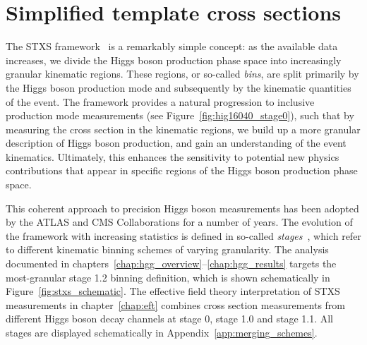 \section{Simplified template cross sections}\label{sec:theory_stxs}
The STXS framework~\cite{deFlorian:2016spz} is a remarkably simple concept: as the available data increases, we divide the Higgs boson production phase space into increasingly granular kinematic regions. These regions, or so-called \textit{bins}, are split primarily by the Higgs boson production mode and subsequently by the kinematic quantities of the event. The framework provides a natural progression to inclusive production mode measurements (see Figure~\ref{fig:hig16040_stage0}), such that by measuring the cross section in the kinematic regions, we build up a more granular description of Higgs boson production, and gain an understanding of the event kinematics. Ultimately, this enhances the sensitivity to potential new physics contributions that appear in specific regions of the Higgs boson production phase space.

This coherent approach to precision Higgs boson measurements has been adopted by the ATLAS and CMS Collaborations for a number of years. The evolution of the framework with increasing statistics is defined in so-called \textit{stages}~\cite{deFlorian:2016spz,Berger:2019wnu}, which refer to different kinematic binning schemes of varying granularity. The \Hgg analysis documented in chapters~\ref{chap:hgg_overview}--\ref{chap:hgg_results} targets the most-granular stage 1.2 binning definition, which is shown schematically in Figure~\ref{fig:stxs_schematic}. The effective field theory interpretation of STXS measurements in chapter~\ref{chap:eft} combines cross section measurements from different Higgs boson decay channels at stage 0, stage 1.0 and stage 1.1. All stages are displayed schematically in Appendix~\ref{app:merging_schemes}.

